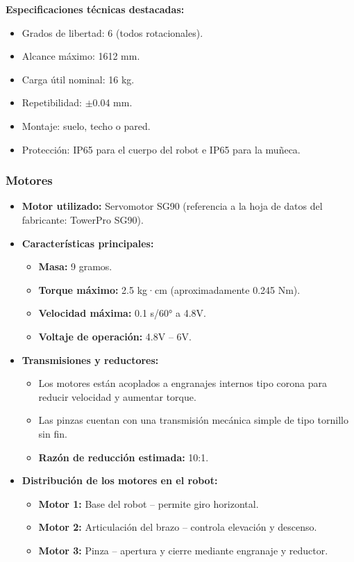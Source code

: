 \textbf{Especificaciones técnicas destacadas:}
\begin{itemize}
	\item Grados de libertad: 6 (todos rotacionales).
	\item Alcance máximo: 1612 mm.
	\item Carga útil nominal: 16 kg.
	\item Repetibilidad: $\pm$0.04 mm.
	\item Montaje: suelo, techo o pared.
	\item Protección: IP65 para el cuerpo del robot e IP65 para la muñeca.
\end{itemize}

\subsubsection{Motores} \label{subsubsec:motores}
	\begin{itemize}
		\item \textbf{Motor utilizado:} Servomotor SG90 (referencia a la hoja de datos del fabricante: TowerPro SG90).
		
		\item \textbf{Características principales:}
		\begin{itemize}
			\item \textbf{Masa:} 9 gramos.
			\item \textbf{Torque máximo:} 2.5 kg·cm (aproximadamente 0.245 Nm).
			\item \textbf{Velocidad máxima:} 0.1 s/60° a 4.8V.
			\item \textbf{Voltaje de operación:} 4.8V – 6V.
		\end{itemize}
		
		\item \textbf{Transmisiones y reductores:}
		\begin{itemize}
			\item Los motores están acoplados a engranajes internos tipo corona para reducir velocidad y aumentar torque.
			\item Las pinzas cuentan con una transmisión mecánica simple de tipo tornillo sin fin.
			\item \textbf{Razón de reducción estimada:} 10:1.
		\end{itemize}
		
		\item \textbf{Distribución de los motores en el robot:}
		\begin{itemize}
			\item \textbf{Motor 1:} Base del robot – permite giro horizontal.
			\item \textbf{Motor 2:} Articulación del brazo – controla elevación y descenso.
			\item \textbf{Motor 3:} Pinza – apertura y cierre mediante engranaje y reductor.
		\end{itemize}
		
	\end{itemize}
	
